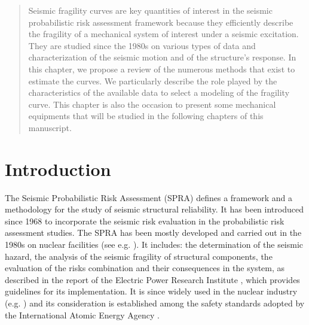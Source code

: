 

\begin{abstract}
    Seismic fragility curves are key quantities of interest in the seismic probabilistic risk assessment framework because they efficiently describe the fragility of a mechanical system of interest under a seismic excitation. They are studied since the 1980s on various types of data and characterization of the seismic motion and of the structure's response. 
    In this chapter, we propose a review of the numerous methods that exist to estimate the curves. We particularly describe the role played by the characteristics of the available data to select a modeling of the fragility curve.
    This chapter is also the occasion to present some mechanical equipments that will be studied in the following chapters of this manuscript.
\end{abstract}

\minitoc


\section{Introduction}


The Seismic Probabilistic Risk Assessment (SPRA) defines a framework and a methodology for the study of seismic structural reliability. %
It has been introduced since 1968 \citep{cornell_engineering_1968}
to incorporate the seismic risk evaluation in the probabilistic risk assessment studies.
The SPRA has been mostly developed and carried out in the 1980s on nuclear facilities (see e.g. \cite{kennedy_probabilistic_1980,kennedy_seismic_1984}). 
It includes: the determination of the seismic hazard, the analysis of the seismic fragility of structural components, the evaluation of the risks combination and their consequences in the system, as described in the report of the Electric Power Research Institute \citep{epri_seismic_2013}, which provides guidelines for its implementation. %
It is since widely used in the nuclear industry (e.g. \cite{ellingwood_validation_1990,park_survey_1998,kennedy_risk_1999}) and its consideration is established among the safety standards adopted by the International Atomic Energy Agency \citep{iaea_probabilistic_2020}.


